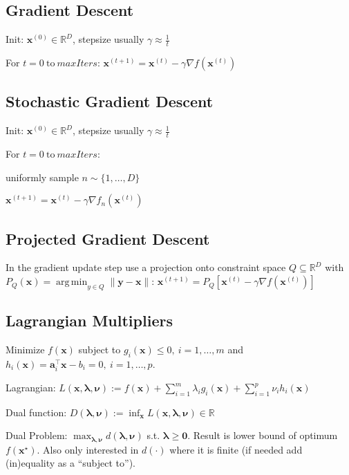 \documentclass[a4paper, 11pt, landscape]{article}
\DeclareMathOperator*{\argmin}{arg\,min}
\begin{document}
\begin{multicols*}{3}
\subsection{Gradient Descent}
\begin{inparaenum}
	\item Init: $\mathbf{x}^{(0)} \in \mathbb{R}^D$, stepsize usually $\gamma \approx \frac{1}{t}$
	\item For $t = 0 \ \text{to} \ \mathit{maxIters}$: $\mathbf{x}^{(t+1)} = \mathbf{x}^{(t)} - \gamma \nabla f(\mathbf{x}^{(t)})$
\end{inparaenum}

\subsection{Stochastic Gradient Descent}
\begin{inparaenum}
	\item Init: $\mathbf{x}^{(0)} \in \mathbb{R}^D$, stepsize usually $\gamma \approx \frac{1}{t}$
	\item For $t = 0 \ \text{to} \ \mathit{maxIters}$:
	\item uniformly sample $n \sim \{1, \ldots, D\}$
	\item $\mathbf{x}^{(t+1)} = \mathbf{x}^{(t)} - \gamma \nabla f_n(\mathbf{x}^{(t)})$
\end{inparaenum}

\subsection{Projected Gradient Descent}
In the gradient update step use a projection onto constraint space $Q \subseteq \mathbb{R}^D$ with $P_Q(\mathbf{x}) = \argmin_{y \in Q} \|\mathbf{y} - \mathbf{x}\|$: $\mathbf{x}^{(t+1)} = P_Q[\mathbf{x}^{(t)} - \gamma \nabla f(\mathbf{x}^{(t)})]$

\subsection{Lagrangian Multipliers}
Minimize  $f(\mathbf{x})$ subject to $g_i(\mathbf{x}) \leq 0,\ i = 1, \ldots, m$ and $h_i(\mathbf{x}) = \mathbf{a}_i^\top \mathbf{x} - b_i = 0,\ i = 1, \ldots, p$.
\begin{compactdesc}
	\item[Lagrangian:] $L(\mathbf{x}, \boldsymbol{\lambda}, \boldsymbol{\nu}) := f(\mathbf{x}) + \sum_{i=1}^m \lambda_i g_i(\mathbf{x}) + \sum_{i=1}^p \nu_i h_i(\mathbf{x})$
	\item[Dual function:] $D(\boldsymbol{\lambda}, \boldsymbol{\nu}) := \inf_{\mathbf{x}} L(\mathbf{x}, \boldsymbol{\lambda}, \boldsymbol{\nu}) \in \mathbb{R}$
	\item[Dual Problem:] $\max_{\boldsymbol{\lambda}, \boldsymbol{\nu}} d(\boldsymbol{\lambda}, \boldsymbol{\nu})$ s.t. $\boldsymbol{\lambda} \geq \mathbf{0}$. Result is lower bound of optimum $f(\mathbf{x}^\star)$. Also only interested in $d(\cdot)$ where it is finite (if needed add (in)equality as a ``subject to'').
\end{compactdesc}


\end{multicols*}
\end{document}
